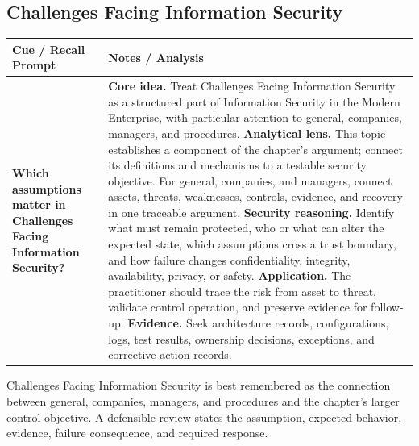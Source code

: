 \documentclass[11pt]{article}
\newcommand{\CornellHeader}{%
\rowcolor{Navy}\color{white}\bfseries Cue / Recall Prompt & \color{white}\bfseries Notes / Analysis\\\hline}
\newcommand{\CornellRow}[2]{%
\cellcolor{CueGray}\RaggedRight\textbf{#1} & \RaggedRight #2\\\hline}
\begin{document}
\subsection*{Challenges Facing Information Security}
\begin{longtable}{>{\RaggedRight\arraybackslash}p{}|>{\RaggedRight\arraybackslash}p{}}
\CornellHeader
\CornellRow{Which assumptions matter in Challenges Facing Information Security?}{\textbf{Core idea.} Treat Challenges Facing Information Security as a structured part of Information Security in the Modern Enterprise, with particular attention to general, companies, managers, and procedures. \textbf{Analytical lens.} This topic establishes a component of the chapter's argument; connect its definitions and mechanisms to a testable security objective. For general, companies, and managers, connect assets, threats, weaknesses, controls, evidence, and recovery in one traceable argument. \textbf{Security reasoning.} Identify what must remain protected, who or what can alter the expected state, which assumptions cross a trust boundary, and how failure changes confidentiality, integrity, availability, privacy, or safety. \textbf{Application.} The practitioner should trace the risk from asset to threat, validate control operation, and preserve evidence for follow-up. \textbf{Evidence.} Seek architecture records, configurations, logs, test results, ownership decisions, exceptions, and corrective-action records.}
\end{longtable}
\begin{topicsummary}
Challenges Facing Information Security is best remembered as the connection between general, companies, managers, and procedures and the chapter's larger control objective. A defensible review states the assumption, expected behavior, evidence, failure consequence, and required response.
\end{topicsummary}
\end{document}
